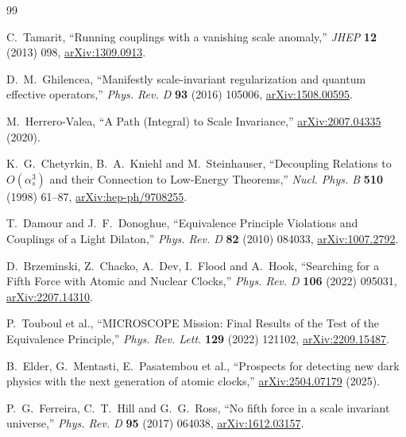 \documentclass[11pt,a4paper]{article}
\begin{document}
\begin{thebibliography}{99}

C.~Tamarit,
``Running couplings with a vanishing scale anomaly,''
\emph{JHEP} \textbf{12} (2013) 098,
\href{https://arxiv.org/abs/1309.0913}{arXiv:1309.0913}.

D.~M.~Ghilencea,
``Manifestly scale-invariant regularization and quantum effective operators,''
\emph{Phys. Rev. D} \textbf{93} (2016) 105006,
\href{https://arxiv.org/abs/1508.00595}{arXiv:1508.00595}.

M.~Herrero-Valea,
``A Path (Integral) to Scale Invariance,''
\href{https://arxiv.org/abs/2007.04335}{arXiv:2007.04335} (2020).

K.~G.~Chetyrkin, B.~A.~Kniehl and M.~Steinhauser,
``Decoupling Relations to $O(\alpha_s^3)$ and their Connection to Low-Energy Theorems,''
\emph{Nucl. Phys. B} \textbf{510} (1998) 61--87,
\href{https://arxiv.org/abs/hep-ph/9708255}{arXiv:hep-ph/9708255}.

T.~Damour and J.~F.~Donoghue,
``Equivalence Principle Violations and Couplings of a Light Dilaton,''
\emph{Phys. Rev. D} \textbf{82} (2010) 084033,
\href{https://arxiv.org/abs/1007.2792}{arXiv:1007.2792}.

D.~Brzeminski, Z.~Chacko, A.~Dev, I.~Flood and A.~Hook,
``Searching for a Fifth Force with Atomic and Nuclear Clocks,''
\emph{Phys. Rev. D} \textbf{106} (2022) 095031,
\href{https://arxiv.org/abs/2207.14310}{arXiv:2207.14310}.

P.~Touboul et al.,
``MICROSCOPE Mission: Final Results of the Test of the Equivalence Principle,''
\emph{Phys. Rev. Lett.} \textbf{129} (2022) 121102,
\href{https://arxiv.org/abs/2209.15487}{arXiv:2209.15487}.

B.~Elder, G.~Mentasti, E.~Pasatembou et al.,
``Prospects for detecting new dark physics with the next generation of atomic clocks,''
\href{https://arxiv.org/abs/2504.07179}{arXiv:2504.07179} (2025).

P.~G.~Ferreira, C.~T.~Hill and G.~G.~Ross,
``No fifth force in a scale invariant universe,''
\emph{Phys. Rev. D} \textbf{95} (2017) 064038,
\href{https://arxiv.org/abs/1612.03157}{arXiv:1612.03157}.

\end{thebibliography}
\end{document}
